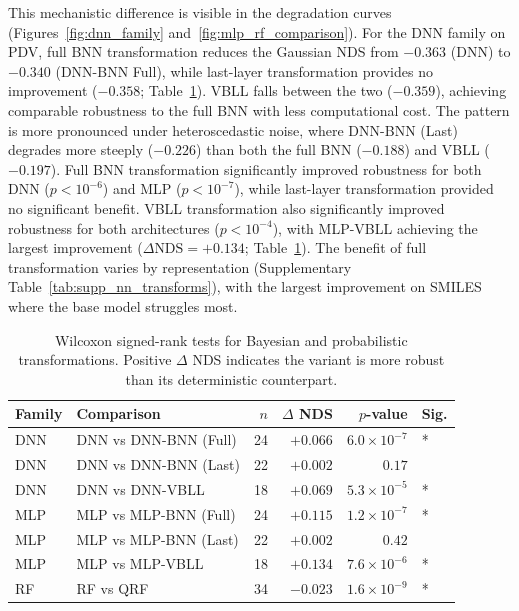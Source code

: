 \documentclass[pdflatex,sn-mathphys-num]{sn-jnl}%
\theoremstyle{thmstyleone}%
\theoremstyle{thmstyletwo}%
\theoremstyle{thmstylethree}%
\begin{document}
This mechanistic difference is visible in the degradation curves (Figures~\ref{fig:dnn_family} and~\ref{fig:mlp_rf_comparison}). For the DNN family on PDV, full BNN transformation reduces the Gaussian NDS from $-0.363$ (DNN) to $-0.340$ (DNN-BNN Full), while last-layer transformation provides no improvement ($-0.358$; Table~\ref{tab:wilcoxon_bnn}). VBLL falls between the two ($-0.359$), achieving comparable robustness to the full BNN with less computational cost. The pattern is more pronounced under heteroscedastic noise, where DNN-BNN (Last) degrades more steeply ($-0.226$) than both the full BNN ($-0.188$) and VBLL ($-0.197$). Full BNN transformation significantly improved robustness for both DNN ($p < 10^{-6}$) and MLP ($p < 10^{-7}$), while last-layer transformation provided no significant benefit. VBLL transformation also significantly improved robustness for both architectures ($p < 10^{-4}$), with MLP-VBLL achieving the largest improvement ($\Delta \text{NDS} = +0.134$; Table~\ref{tab:wilcoxon_bnn}). The benefit of full transformation varies by representation (Supplementary Table~\ref{tab:supp_nn_transforms}), with the largest improvement on SMILES where the base model struggles most.

\begin{table}[htbp]
\centering
\caption{Wilcoxon signed-rank tests for Bayesian and probabilistic transformations. Positive $\Delta$ NDS indicates the variant is more robust than its deterministic counterpart.}
\label{tab:wilcoxon_bnn}
\small
\begin{tabular}{llrrrl}
\toprule
\textbf{Family} & \textbf{Comparison} & \textbf{$n$} & \textbf{$\Delta$ NDS} & \textbf{$p$-value} & \textbf{Sig.} \\
\midrule
DNN & DNN vs DNN-BNN (Full) & 24 & $+0.066$ & $6.0 \times 10^{-7}$ & * \\
DNN & DNN vs DNN-BNN (Last) & 22 & $+0.002$ & $0.17$ & \\
DNN & DNN vs DNN-VBLL & 18 & $+0.069$ & $5.3 \times 10^{-5}$ & * \\
MLP & MLP vs MLP-BNN (Full) & 24 & $+0.115$ & $1.2 \times 10^{-7}$ & * \\
MLP & MLP vs MLP-BNN (Last) & 22 & $+0.002$ & $0.42$ & \\
MLP & MLP vs MLP-VBLL & 18 & $+0.134$ & $7.6 \times 10^{-6}$ & * \\
RF  & RF vs QRF             & 34 & $-0.023$ & $1.6 \times 10^{-9}$ & * \\
\bottomrule
\end{tabular}
\end{table}
\end{document}
